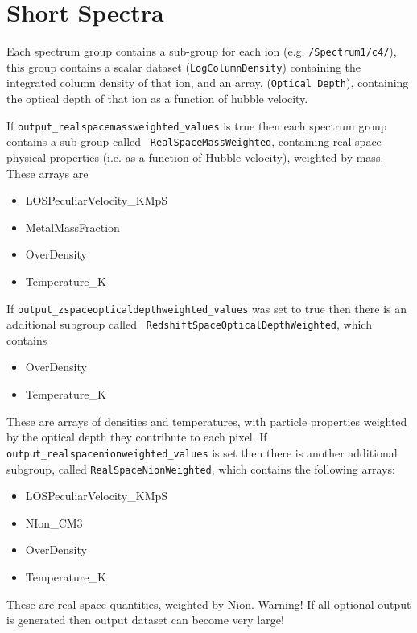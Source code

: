 \documentclass{report}
\begin{document}
\section{Short Spectra}

Each spectrum group contains a sub-group for each ion
(e.g. {\tt /Spectrum1/c4/}), this group contains a scalar dataset
({\tt LogColumnDensity}) containing the integrated column density of
that ion, and an array, ({\tt Optical Depth}), containing the optical
depth of that ion as a function of hubble velocity.

If {\tt output\_realspacemassweighted\_values} is true then each
spectrum group contains a sub-group called {\tt
  RealSpaceMassWeighted}, containing real space physical properties
(i.e. as a function of Hubble velocity), weighted by mass.  These
arrays are

\begin{itemize}
\item LOSPeculiarVelocity\_KMpS
\item MetalMassFraction
\item OverDensity
\item Temperature\_K
\end{itemize}

If {\tt output\_zspaceopticaldepthweighted\_values} was set to true
then there is an additional subgroup called {\tt
  RedshiftSpaceOpticalDepthWeighted}, which contains

\begin{itemize}
\item OverDensity
\item Temperature\_K
\end{itemize}

These are arrays of densities and temperatures, with particle properties weighted by the optical depth they contribute to each pixel.  If {\tt output\_realspacenionweighted\_values} is set then there is another additional subgroup, called {\tt RealSpaceNionWeighted}, which contains the following arrays:

\begin{itemize}
\item LOSPeculiarVelocity\_KMpS
\item NIon\_CM3
\item OverDensity
\item Temperature\_K
\end{itemize}

These are real space quantities, weighted by Nion.  Warning!  If all optional output is generated then output dataset can become very large!
\end{document}
